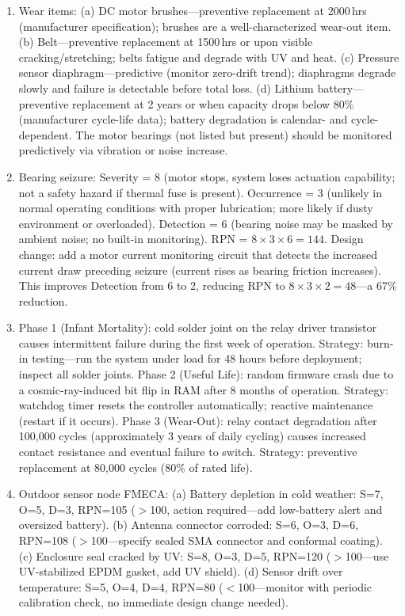 \documentclass[11pt,letterpaper,twoside,openany]{book}
\begin{document}
\begin{enumerate}[leftmargin=1.5em]
\item Wear items: (a) DC motor brushes---preventive replacement at 2000\,hrs (manufacturer specification); brushes are a well-characterized wear-out item. (b) Belt---preventive replacement at 1500\,hrs or upon visible cracking/stretching; belts fatigue and degrade with UV and heat. (c) Pressure sensor diaphragm---predictive (monitor zero-drift trend); diaphragms degrade slowly and failure is detectable before total loss. (d) Lithium battery---preventive replacement at 2 years or when capacity drops below 80\% (manufacturer cycle-life data); battery degradation is calendar- and cycle-dependent. The motor bearings (not listed but present) should be monitored predictively via vibration or noise increase.

\item Bearing seizure: Severity = 8 (motor stops, system loses actuation capability; not a safety hazard if thermal fuse is present). Occurrence = 3 (unlikely in normal operating conditions with proper lubrication; more likely if dusty environment or overloaded). Detection = 6 (bearing noise may be masked by ambient noise; no built-in monitoring). RPN = $8 \times 3 \times 6 = 144$. Design change: add a motor current monitoring circuit that detects the increased current draw preceding seizure (current rises as bearing friction increases). This improves Detection from 6 to 2, reducing RPN to $8 \times 3 \times 2 = 48$---a 67\% reduction.

\item Phase 1 (Infant Mortality): cold solder joint on the relay driver transistor causes intermittent failure during the first week of operation. Strategy: burn-in testing---run the system under load for 48 hours before deployment; inspect all solder joints. Phase 2 (Useful Life): random firmware crash due to a cosmic-ray-induced bit flip in RAM after 8 months of operation. Strategy: watchdog timer resets the controller automatically; reactive maintenance (restart if it occurs). Phase 3 (Wear-Out): relay contact degradation after 100,000 cycles (approximately 3 years of daily cycling) causes increased contact resistance and eventual failure to switch. Strategy: preventive replacement at 80,000 cycles (80\% of rated life).

\item Outdoor sensor node FMECA: (a) Battery depletion in cold weather: S=7, O=5, D=3, RPN=105 ($>$100, action required---add low-battery alert and oversized battery). (b) Antenna connector corroded: S=6, O=3, D=6, RPN=108 ($>$100---specify sealed SMA connector and conformal coating). (c) Enclosure seal cracked by UV: S=8, O=3, D=5, RPN=120 ($>$100---use UV-stabilized EPDM gasket, add UV shield). (d) Sensor drift over temperature: S=5, O=4, D=4, RPN=80 ($<$100---monitor with periodic calibration check, no immediate design change needed).


\end{enumerate}
\end{document}

